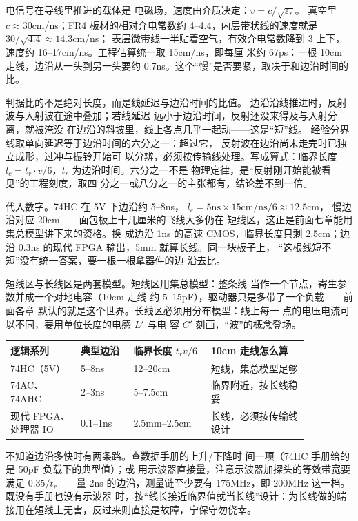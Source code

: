电信号在导线里推进的载体是
电磁场，速度由介质决定：$v=c/\sqrt{\varepsilon_r}$。
真空里 $c\approx30$cm/ns；FR4 板材的相对介电常数约
4--4.4，内层带状线的速度就是 $30/\sqrt{4.4}\approx14.3$cm/ns；
表层微带线一半贴着空气，有效介电常数降到 3 上下，
速度约 16--17cm/ns。工程估算统一取 15cm/ns，即每厘
米约 67ps：一根 10cm 走线，边沿从一头到另一头要约
0.7ns。这个“慢”是否要紧，取决于和边沿时间的比。

判据比的不是绝对长度，而是线延迟与边沿时间的比值。
边沿沿线推进时，反射波与入射波在途中叠加；若线延迟
远小于边沿时间，反射还没来得及与入射分离，就被淹没
在边沿的斜坡里，线上各点几乎一起动——这是“短”线。
经验分界线取单向延迟等于边沿时间的六分之一：超过它，
反射波在边沿尚未走完时已独立成形，过冲与振铃开始可
以分辨，必须按传输线处理。写成算式：临界长度
$l_c=t_r\cdot v/6$，$t_r$ 为边沿时间。六分之一不是
物理定律，是“反射刚开始能被看见”的工程刻度，取四
分之一或八分之一的主张都有，结论差不到一倍。

代入数字。74HC 在 5V 下边沿约 5--8ns，
$l_c=5\text{ns}\times15\text{cm/ns}/6\approx12.5$cm，
慢边沿对应 20cm——面包板上十几厘米的飞线大多仍在
短线区，这正是前面七章能用集总模型讲下来的资格。换
成边沿 1ns 的高速 CMOS，临界长度只剩 2.5cm；边沿
0.3ns 的现代 FPGA 输出，5mm 就算长线。同一块板子上，
“这根线短不短”没有统一答案，要一根一根拿器件的边
沿去比。

短线区与长线区是两套模型。短线区用集总模型：整条线
当作一个节点，寄生参数并成一个对地电容（10cm 走线
约 5--15pF），驱动器只是多带了一个负载——前面各章
默认的就是这个世界。长线区必须用分布模型：线上每一
点的电压电流可以不同，要用单位长度的电感 $L'$ 与电
容 $C'$ 刻画，“波”的概念登场。

\begin{longtable}{L{0.2\linewidth}L{0.15\linewidth}L{0.22\linewidth}L{0.29\linewidth}}
\toprule
逻辑系列 & 典型边沿 & 临界长度 $t_r v/6$ & 10cm 走线怎么算 \\
\midrule
74HC（5V） & 5--8ns & 12--20cm & 短线，集总模型足够 \\
74AC、74AHC & 2--3ns & 5--7.5cm & 临界附近，按长线稳妥 \\
现代 FPGA、处理器 IO & 0.1--1ns & 2.5mm--2.5cm & 长线，必须按传输线设计 \\
\bottomrule
\end{longtable}

不知道边沿多快时有两条路。查数据手册的上升/下降时
间一项（74HC 手册给的是 50pF 负载下的典型值）；或
用示波器直接量，注意示波器加探头的等效带宽要满足
$0.35/t_r$——量 2ns 的边沿，测量链至少要有
175MHz，即 200MHz 这一档。既没有手册也没有示波器
时，按“线长接近临界值就当长线”设计：为长线做的端
接用在短线上无害，反过来则直接是故障，宁保守勿侥幸。

